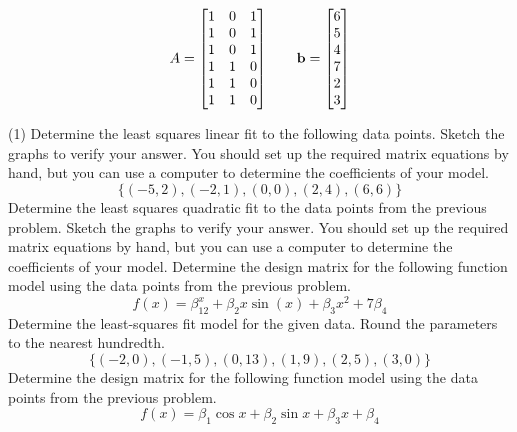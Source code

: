 \begin{tasks}[style=enumerate]
\begin{displaymath}
    A =
    \begin{bmatrix}
      1 & 0 & 1 \\
      1 & 0 & 1 \\
      1 & 0 & 1 \\
      1 & 1 & 0 \\
      1 & 1 & 0 \\
      1 & 1 & 0 \\
    \end{bmatrix}
    \qquad
    \mathbf b =
    \begin{bmatrix}
      6 \\ 5 \\ 4 \\ 7 \\ 2 \\ 3
    \end{bmatrix}
  \end{displaymath}
\end{tasks}
\begin{tasks}[resume, style=enumerate](1)
\task
  Determine the least squares linear fit to the following data points.
  Sketch the graphs to verify your answer.  You should set up the
  required matrix equations by hand, but you can use a computer to
  determine the coefficients of your model.
  \begin{displaymath}
    \{(-5, 2), (-2, 1), (0, 0), (2, 4), (6, 6)\}
  \end{displaymath}
\task Determine the least squares quadratic fit to the data points
  from the previous problem. Sketch the graphs to verify your answer.
  You should set up the required matrix equations by hand, but you can
  use a computer to determine the coefficients of your model.
\task Determine the design matrix for the following function model
  using the data points from the previous problem.
  \begin{displaymath}
    f(x) = \beta_12^x + \beta_2x\sin(x) + \beta_3x^2 + 7\beta_4
  \end{displaymath}
\task
  Determine the least-squares fit model for the given data.  Round the
  parameters to the nearest hundredth.
  \begin{displaymath}
    \{(-2, 0), (-1, 5), (0, 13), (1, 9), (2, 5), (3, 0)\}
  \end{displaymath}
\task
  Determine the design matrix for the following function model using
  the data points from the previous problem.
  \begin{displaymath}
    f(x) = \beta_1 \cos x + \beta_2 \sin x + \beta_3 x + \beta_4
  \end{displaymath}
\end{tasks}

